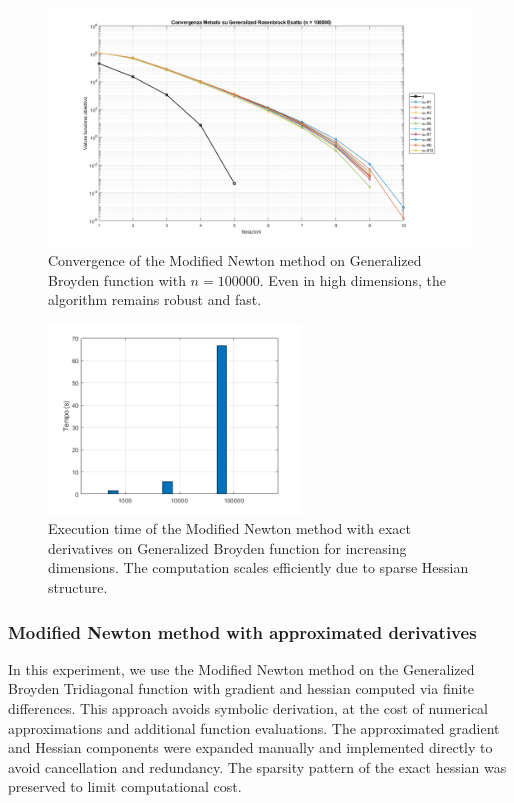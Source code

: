 \documentclass[a4paper,12pt]{article}
\begin{document}
	\begin{figure}[H]
		\centering
		\includegraphics[width=\textwidth]{../immagini/broyden_100k.png}
		\caption{Convergence of the Modified Newton method on Generalized Broyden function with $n=100000$. Even in high dimensions, the algorithm remains robust and fast.}
		\label{fig:gb_100k_exact}
	\end{figure}
	
	\begin{figure}[htbp]
		\centering
		\includegraphics[width=0.6\textwidth]{../immagini/broyden_time_exact.png}
		\caption{Execution time of the Modified Newton method with exact derivatives on Generalized Broyden function for increasing dimensions. The computation scales efficiently due to sparse Hessian structure.}
		\label{fig:gb_time_exact}
	\end{figure}
	
	
	\subsubsection{Modified Newton method with approximated derivatives}
	
	In this experiment, we use the Modified Newton method on the Generalized Broyden Tridiagonal function with gradient and hessian computed via finite differences. This approach avoids symbolic derivation, at the cost of numerical approximations and additional function evaluations. The approximated gradient and Hessian components were expanded manually and implemented directly to avoid cancellation and redundancy. The sparsity pattern of the exact hessian was preserved to limit computational cost.
	
\end{document}
